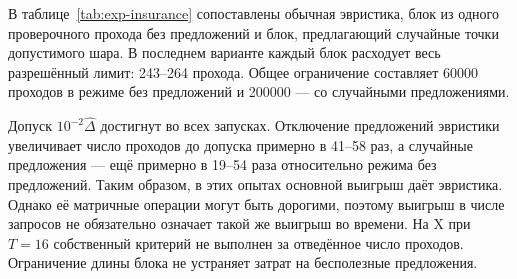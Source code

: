 В таблице~\ref{tab:exp-insurance} сопоставлены обычная эвристика,
блок из одного проверочного прохода без предложений и блок, предлагающий
случайные точки допустимого шара. В последнем варианте каждый блок расходует
весь разрешённый лимит: 243--264 прохода.
Общее ограничение составляет 60000 проходов в режиме без предложений
и 200000 --- со случайными предложениями.

Допуск $10^{-2}\widehat\Delta$ достигнут во всех запусках.
Отключение предложений эвристики увеличивает число проходов до допуска
примерно в 41--58 раз, а случайные предложения --- ещё примерно
в 19--54 раза относительно режима без предложений. Таким образом,
в этих опытах основной выигрыш даёт эвристика. Однако её матричные
операции могут быть дорогими, поэтому выигрыш в числе запросов
не обязательно означает такой же выигрыш во времени.
На X при $T=16$ собственный критерий не выполнен за отведённое
число проходов. Ограничение длины блока не устраняет затрат
на бесполезные предложения.
\FloatBarrier
